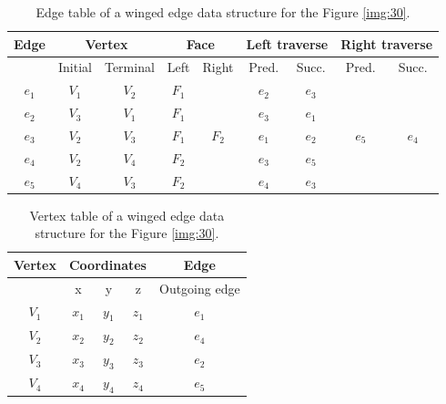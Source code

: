 \begin{table}[]\centering
    \begin{tabular}{|c|cc|cc|cc|cc|}
    \hline
    \hline
    Edge  & \multicolumn{2}{c|}{Vertex} & \multicolumn{2}{c|}{Face} & \multicolumn{2}{c|}{Left traverse} & \multicolumn{2}{c|}{Right traverse} \\ \hline
          & Initial      & Terminal     & Left        & Right       & Pred.            & Succ.           & Pred.            & Succ.            \\ \hline\hline
    $e_1$ & $V_1$        & $V_2$        & $F_1$       &             & $e_2$            & $e_3$           &                  &                  \\ \hline
    $e_2$ & $V_3$        & $V_1$        & $F_1$       &             & $e_3$            & $e_1$           &                  &                  \\ \hline
    $e_3$ & $V_2$        & $V_3$        & $F_1$       & $F_2$       & $e_1$            & $e_2$           & $e_5$            & $e_4$            \\ \hline
    $e_4$ & $V_2$        & $V_4$        & $F_2$       &             & $e_3$            & $e_5$           &                  &                  \\ \hline
    $e_5$ & $V_4$        & $V_3$        & $F_2$       &             & $e_4$            & $e_3$           &                  &                  \\ \hline\hline
    \end{tabular}
\caption{Edge table of a winged edge data structure for the Figure \ref{img:30}.}
\label{tab:2}
\end{table}

\begin{table}[]
    \centering
    \begin{tabular}{|c|ccc|c|}
    \hline
    \hline
    Vertex  & \multicolumn{3}{c|}{Coordinates}          & Edge            \\ \hline
          & x            & y            & z           & Outgoing edge   \\ \hline\hline
    $V_1$ & $x_1$        & $y_1$        & $z_1$       & $e_1$           \\ \hline
    $V_2$ & $x_2$        & $y_2$        & $z_2$       & $e_4$           \\ \hline
    $V_3$ & $x_3$        & $y_3$        & $z_3$       & $e_2$           \\ \hline
    $V_4$ & $x_4$        & $y_4$        & $z_4$       & $e_5$           \\ \hline\hline
    \end{tabular}
\caption{Vertex table of a winged edge data structure for the Figure \ref{img:30}.}
\label{tab:3}
\end{table}


